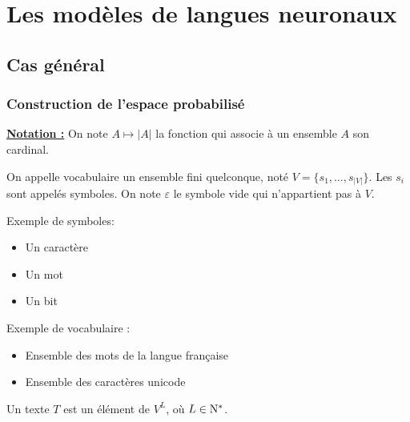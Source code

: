 

\title{}
\author{Etienne Boisseau, Olivier Dulcy, Christos Katsoulakis, Eric Lavergne}
\date{}

\pagestyle{theme}



\tableofcontents

\section{Les modèles de langues neuronaux}

\subsection{Cas général}

\subsubsection{Construction de l'espace probabilisé}

\underline{\textbf{Notation :}} On note $A \mapsto \vert A \vert$ la fonction qui associe à un ensemble $A$ son cardinal.

\begin{definition}
  On appelle vocabulaire un ensemble fini quelconque, noté $V = \{ s_1, \ldots, s_{\vert V \vert} \}$. Les $s_i$ sont appelés symboles.
  On note $\varepsilon$ le symbole vide qui n'appartient pas à $V$.
\end{definition}

Exemple de symboles:
\begin{itemize}
\item Un caractère
\item Un mot
\item Un bit
\end{itemize}

Exemple de vocabulaire :
  \begin{itemize}
      \item Ensemble des mots de la langue française
      \item Ensemble des caractères unicode
  \end{itemize}

\begin{definition}
Un texte $T$ est un élément de $V^L$, où $L \in \mathrm{N}^*$.
\end{definition}


